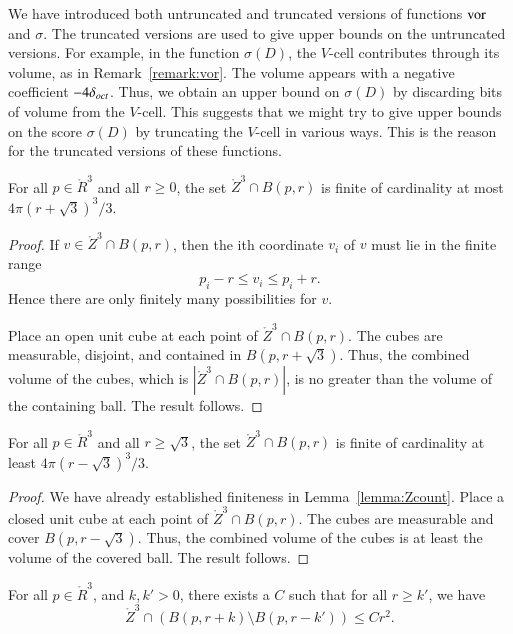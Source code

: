\begin{remark}  We have introduced both untruncated and truncated
versions of functions $\operatorname{vor}$ and $\sigma$.  The truncated versions
are used to give upper bounds on the untruncated versions.  For
example,  in the function $\sigma(D)$, the $V$-cell contributes
through its volume, as in Remark~\ref{remark:vor}.  The volume
appears with a negative coefficient $-4\delta_{oct}$.  Thus, we obtain an
upper bound on $\sigma(D)$ by discarding bits of volume from the
$V$-cell.   This suggests that we might try to give upper bounds
on the score $\sigma(D)$ by truncating the $V$-cell in various
ways. This is the reason for the truncated versions of these
functions.
\end{remark}

\begin{lemma}\label{lemma:Zcount}
    For all $p\in\ring{R}^3$ and all $r\ge 0$, the set
    $\ring{Z}^3\cap B(p,r)$ is finite of cardinality at most
    $4\pi (r+\sqrt3)^3/3$.
\end{lemma}

\begin{proof}  If $v\in\ring{Z}^3\cap B(p,r)$, then the ith
coordinate $v_i$ of $v$ must lie in the finite range
    $$
    p_i - r \le v_i \le p_i + r.
    $$
Hence there are only finitely many possibilities for $v$.


Place an open unit cube at each point of $\ring{Z}^3\cap B(p,r)$.
The cubes are measurable, disjoint, and contained in
$B(p,r+\sqrt3)$.  Thus, the combined volume of the cubes, which is
$|\ring{Z}^3\cap B(p,r)|$,  is no greater than the volume of the
containing ball.  The result follows.
\end{proof}

\begin{lemma}\label{lemma:Zlow-count}
  For all $p\in\ring{R}^3$ and all $r\ge\sqrt3$, the set
    $\ring{Z}^3\cap B(p,r)$ is finite of cardinality at least
    $4\pi (r-\sqrt3)^3/3$.
\end{lemma}

\begin{proof} We have already established finiteness in
Lemma~\ref{lemma:Zcount}.  Place a closed unit cube at each point
of $\ring{Z}^3\cap B(p,r)$.  The cubes are measurable and cover
$B(p,r-\sqrt3)$.  Thus, the combined volume of the cubes is at
least the volume of the covered ball.  The result follows.
\end{proof}

\begin{lemma}\label{lemma:Zr2}
For all $p\in\ring{R}^3$, and $k,k'>0$, there exists a $C$ such
that for all $r\ge k'$, we have
    $$
    \ring{Z}^3 \cap (B(p,r+k) \setminus B(p,r-k')) \le C r^2.
    $$
\end{lemma}

